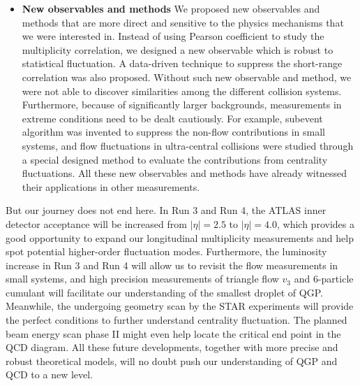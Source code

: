 \begin{itemize}
\item \textbf{New observables and methods} We proposed new observables and methods that are more direct and sensitive to the physics mechanisms that we were interested in. Instead of using Pearson coefficient to study the multiplicity correlation, we designed a new observable which is robust to statistical fluctuation. A data-driven technique to suppress the short-range correlation was also proposed. Without such new observable and method, we were not able to discover similarities among the different collision systems. Furthermore, because of significantly larger backgrounds, measurements in extreme conditions need to be dealt cautiously. For example, subevent algorithm was invented to suppress the non-flow contributions in small systems, and flow fluctuations in ultra-central collisions were studied through a special designed method to evaluate the contributions from centrality fluctuations. All these new observables and methods have already witnessed their applications in other measurements.
\end{itemize}

But our journey does not end here. In Run 3 and Run 4, the ATLAS inner detector acceptance will be increased from $|\eta|=2.5$ to $|\eta|=4.0$, which provides a good opportunity to expand our longitudinal multiplicity measurements and help spot potential higher-order fluctuation modes. Furthermore, the luminosity increase in Run 3 and Run 4 will allow us to revisit the flow measurements in small systems, and high precision measurements of triangle flow $v_3$ and 6-particle cumulant will facilitate our understanding of the smallest droplet of QGP. Meanwhile, the undergoing geometry scan by the STAR experiments will provide the perfect conditions to further understand centrality fluctuation. The planned beam energy scan phase II might even help locate the critical end point in the QCD diagram. All these future developments, together with more precise and robust theoretical models, will no doubt push our understanding of QGP and QCD to a new level.

